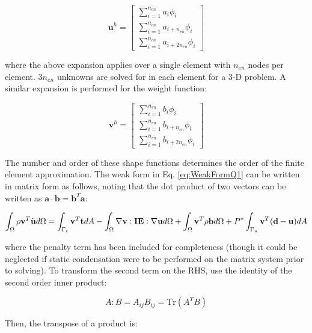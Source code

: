 \documentclass[10pt]{article}
\begin{document}
\begin{equation}
\label{eq:UExpansion}
\textbf{u}^h=\begin{bmatrix}\sum_{i=1}^{n_{en}}a_i\phi_i\\\sum_{i=1}^{n_{en}}a_{i+n_{en}}\phi_i\\\sum_{i=1}^{n_{en}}a_{i+2n_{en}}\phi_i\end{bmatrix}
\end{equation}

where the above expansion applies over a single element with \(n_{en}\) nodes per element. \(3n_{en}\) unknowns are solved for in each element for a 3-D problem. A similar expansion is performed for the weight function:

\begin{equation}
\textbf{v}^h=\begin{bmatrix}\sum_{i=1}^{n_{en}}b_i\phi_i\\\sum_{i=1}^{n_{en}}b_{i+n_{en}}\phi_i\\\sum_{i=1}^{n_{en}}b_{i+2n_{en}}\phi_i\end{bmatrix}
\end{equation}

The number and order of these shape functions determines the order of the finite element approximation. The weak form in Eq. \eqref{eq:WeakFormQ1} can be written in matrix form as follows, noting that the dot product of two vectors can be written as \(\textbf{a}\cdot\textbf{b}=\textbf{b}^T\textbf{a}\):

\begin{equation}
\label{eq:FEStep1}
\int_{\Omega}\rho\textbf{v}^T\ddot{\textbf{u}}d\Omega=\int_{\Gamma_t}\textbf{v}^T\textbf{t}dA- \int_{\Omega}\nabla\textbf{v}:\textbf{IE}:\nabla\textbf{u}d\Omega +\int_{\Omega}\textbf{v}^T\rho\textbf{b}d\Omega+P^{*}\int_{\Gamma_u}\textbf{v}^T(\textbf{d}-\textbf{u})dA\\
\end{equation}

where the penalty term has been included for completeness (though it could be neglected if static condensation were to be performed on the matrix system prior to solving). To transform the second term on the RHS, use the identity of the second order inner product:

\begin{equation}
A:B=A_{ij}B_{ij}=\text{Tr}(A^TB)
\end{equation}

Then, the transpose of a product is:
\end{document}
